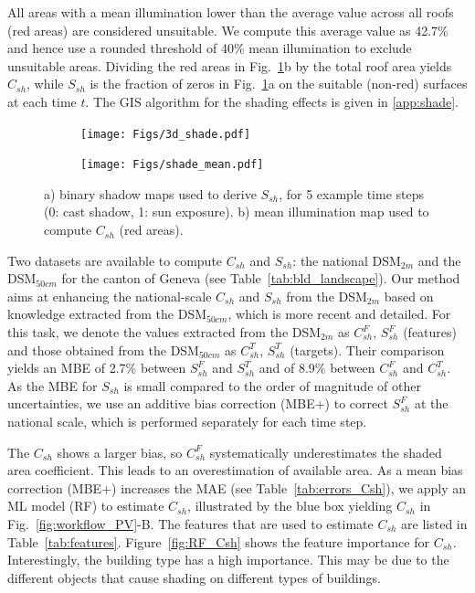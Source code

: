 All areas with a mean illumination lower than the average value across all roofs (red areas) are considered unsuitable. 
We compute this average value as 42.7\% and hence use a rounded threshold of 40\% mean illumination to exclude unsuitable areas.
Dividing the red areas in Fig.~\ref{fig:horizons}b by the total roof area yields $C_{sh}$, while $S_{sh}$ is the fraction of zeros in Fig.~\ref{fig:horizons}a on the suitable (non-red) surfaces at each time $t$. The GIS algorithm for the shading effects is given in \ref{app:shade}. 

\begin{figure}[tb]
	\centering
	\begin{subfigure}{.52\textwidth}
		\centering
		\texttt{[image: Figs/3d\_shade.pdf]} 
		\subcaption{}
	\end{subfigure}
	\begin{subfigure}{.44\textwidth}
		\centering
		\texttt{[image: Figs/shade\_mean.pdf]}  
		\subcaption{}
	\end{subfigure}
	\caption{a) binary shadow maps used to derive $S_{sh}$, for 5 example time steps (0: cast shadow, 1: sun exposure). b) mean illumination map used to compute $C_{sh}$ (red areas).}
	\label{fig:horizons}
\end{figure}

Two datasets are available to compute $C_{sh}$ and $S_{sh}$: the national DSM$_{2m}$ and the DSM$_{50cm}$ for the canton of Geneva (see Table~\ref{tab:bld_landscape}). Our method aims at enhancing the national-scale $C_{sh}$ and $S_{sh}$ from the DSM$_{2m}$ based on knowledge extracted from the DSM$_{50cm}$, which is more recent and detailed. For this task, we denote the values extracted from the DSM$_{2m}$ as $C_{sh}^F$, $S_{sh}^F$ (features) and those obtained from the DSM$_{50cm}$ as $C_{sh}^T$, $S_{sh}^T$ (targets).
%
Their comparison yields an MBE of 2.7\% between $S_{sh}^F$ and $S_{sh}^T$ and of 8.9\% between $C_{sh}^F$ and $C_{sh}^T$. As the MBE for $S_{sh}$ is small compared to the order of magnitude of other uncertainties, we use an additive bias correction (MBE+) to correct $S_{sh}^F$ at the national scale, which is performed separately for each time step. 

The $C_{sh}$ shows a larger bias, so $C_{sh}^F$ systematically underestimates the shaded area coefficient. This leads to an overestimation of available area. 
As a mean bias correction (MBE+) increases the MAE (see Table~\ref{tab:errors_Csh}), we apply an ML model (RF) to estimate $C_{sh}$, illustrated by the blue box yielding $C_{sh}$ in Fig.~\ref{fig:workflow_PV}-B. 
The features that are used to estimate  $C_{sh}$ are listed in Table~\ref{tab:features}.
Figure~\ref{fig:RF_Csh} shows the feature importance for $C_{sh}$. Interestingly, the building type has a high importance. This may be due to the different objects that cause shading on different types of buildings. 

